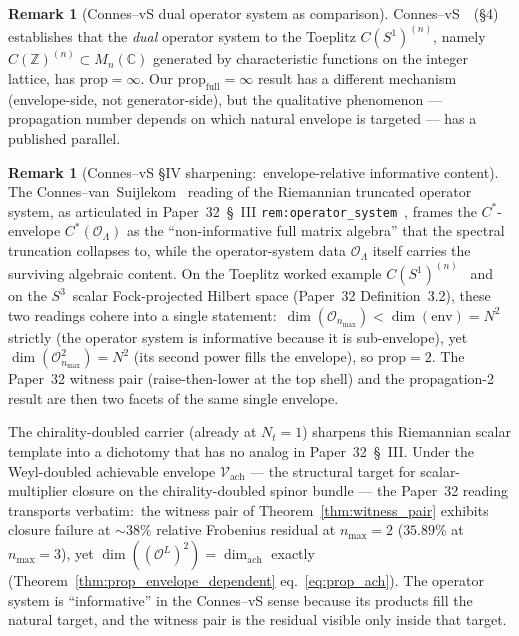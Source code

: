 \documentclass[11pt,a4paper]{article}
\theoremstyle{plain}
\theoremstyle{definition}
\newtheorem{remark}[theorem]{Remark}
\newcommand{\nmax}{n_{\max}}
\newcommand{\Nt}{N_t}
\newcommand{\sthree}{S^{3}}
\newcommand{\Op}{\mathcal{O}}
\newcommand{\C}{\mathbb{C}}
\newcommand{\Z}{\mathbb{Z}}
\newcommand{\Mat}{M}
\newcommand{\prop}{\mathrm{prop}}
\newcommand{\achievable}{\mathrm{ach}}
\begin{document}
\begin{remark}[Connes--vS dual operator system as comparison]
\label{rem:comparison}
Connes--vS~\cite{connes_vs2021}~(\S 4) establishes that the
\emph{dual} operator system to the Toeplitz $C(S^1)^{(n)}$, namely
$C(\Z)^{(n)} \subset \Mat_n(\C)$ generated by characteristic
functions on the integer lattice, has $\prop = \infty$. Our
$\prop_{\mathrm{full}} = \infty$ result has a different mechanism
(envelope-side, not generator-side), but the qualitative
phenomenon — propagation number depends on which natural envelope is
targeted — has a published parallel.
\end{remark}

\begin{remark}[Connes--vS \S IV sharpening:\ envelope-relative
informative content]\label{rem:cvs_sharpening}
The Connes--van~Suijlekom~\cite{connes_vs2021} reading of the
Riemannian truncated operator system, as articulated in
Paper~32~\S~III \texttt{rem:operator\_system}~\cite{paper32}, frames
the $C^*$-envelope $C^*(\Op_\Lambda)$ as the ``non-informative full
matrix algebra'' that the spectral truncation collapses to, while
the operator-system data $\Op_\Lambda$ itself carries the surviving
algebraic content. On the Toeplitz worked example
$C(S^1)^{(n)}$~\cite[\S\,3.1]{connes_vs2021} and on the
$\sthree$~scalar Fock-projected Hilbert space (Paper~32 Definition~3.2),
these two readings cohere into a single statement:\
$\dim(\Op_{\nmax}) < \dim(\mathrm{env}) = N^2$ strictly (the operator
system is informative because it is sub-envelope), yet
$\dim(\Op_{\nmax}^2) = N^2$ (its second power fills the envelope), so
$\prop = 2$. The Paper~32 witness pair (raise-then-lower at the top
shell) and the propagation-2 result are then two facets of the same
single envelope.

The chirality-doubled carrier (already at $\Nt = 1$) sharpens this
Riemannian scalar template into a dichotomy that has no analog in
Paper~32~\S~III. Under the Weyl-doubled achievable envelope
$\mathcal{V}_\achievable$ — the structural target for
scalar-multiplier closure on the chirality-doubled spinor bundle —
the Paper~32 reading transports verbatim:\ the witness pair of
Theorem~\ref{thm:witness_pair} exhibits closure failure at
$\sim 38\%$ relative Frobenius residual at $\nmax = 2$ ($35.89\%$ at
$\nmax = 3$),
yet $\dim((\Op^L)^2) = \dim_\achievable$ exactly
(Theorem~\ref{thm:prop_envelope_dependent} eq.~\eqref{eq:prop_ach}).
The operator system is ``informative'' in the Connes--vS sense
because its products fill the natural target, and the witness pair
is the residual visible only inside that target.


\end{remark}
\end{document}

